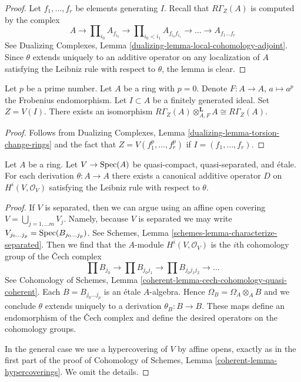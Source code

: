 \begin{proof}
Let $f_1, \ldots, f_r$ be elements generating $I$.
Recall that $R\Gamma_Z(A)$ is computed by the complex
$$
A \to \prod\nolimits_{i_0} A_{f_{i_0}} \to
\prod\nolimits_{i_0 < i_1} A_{f_{i_0}f_{i_1}}
\to \ldots \to A_{f_1\ldots f_r}
$$
See Dualizing Complexes, Lemma \ref{dualizing-lemma-local-cohomology-adjoint}.
Since $\theta$ extends uniquely to an additive operator on
any localization of $A$ satisfying the Leibniz rule with
respect to $\theta$, the lemma is clear.
\end{proof}

\begin{lemma}
\label{lemma-frobenius}
Let $p$ be a prime number. Let $A$ be a ring with $p = 0$.
Denote $F : A \to A$, $a \mapsto a^p$ the Frobenius endomorphism.
Let $I \subset A$ be a finitely generated ideal. Set $Z = V(I)$.
There exists an isomorphism
$R\Gamma_Z(A) \otimes_{A, F}^\mathbf{L} A \cong R\Gamma_Z(A)$.
\end{lemma}

\begin{proof}
Follows from Dualizing Complexes, Lemma
\ref{dualizing-lemma-torsion-change-rings}
and the fact that $Z = V(f_1^p, \ldots, f_r^p)$
if $I = (f_1, \ldots, f_r)$.
\end{proof}

\begin{lemma}
\label{lemma-etale-derivation}
Let $A$ be a ring. Let $V \to \mathop{\mathrm{Spec}}(A)$ be quasi-compact, quasi-separated,
and \'etale. For each derivation $\theta : A \to A$ there exists a canonical
additive operator $D$ on $H^i(V, \mathcal{O}_V)$
satisfying the Leibniz rule with respect to $\theta$.
\end{lemma}

\begin{proof}
If $V$ is separated, then we can argue using an affine open covering
$V = \bigcup_{j = 1, \ldots m} V_j$. Namely, because $V$ is separated
we may write $V_{j_0 \ldots j_p} = \mathop{\mathrm{Spec}}(B_{j_0 \ldots j_p})$.
See Schemes, Lemma \ref{schemes-lemma-characterize-separated}. Then we
find that the $A$-module $H^i(V, \mathcal{O}_V)$
is the $i$th cohomology group of the {\v C}ech complex
$$
\prod B_{j_0} \to
\prod B_{j_0j_1} \to
\prod B_{j_0j_1j_2} \to \ldots
$$
See Cohomology of Schemes, Lemma
\ref{coherent-lemma-cech-cohomology-quasi-coherent}.
Each $B = B_{j_0 \ldots j_p}$ is an \'etale $A$-algebra.
Hence $\Omega_B = \Omega_A \otimes_A B$ and we conclude
$\theta$ extends uniquely to a derivation $\theta_B : B \to B$.
These maps define an endomorphism of the {\v C}ech complex
and define the desired operators on the cohomology groups.

\medskip\noindent
In the general case we use a hypercovering of $V$ by
affine opens, exactly as in the first part of the proof of
Cohomology of Schemes, Lemma \ref{coherent-lemma-hypercoverings}.
We omit the details.
\end{proof}

